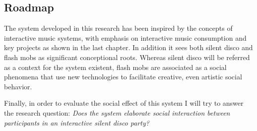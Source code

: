 
\subsection{Roadmap}


The system developed in this research has been inspired by the concepts of interactive music systems, with emphasis on interactive music consumption and key projects as shown in the last chapter. In addition it sees both silent disco and flash mobs as significant conceptional roots. Whereas silent disco will be referred as a context for the system existent, flash mobs are associated as a social phenomena that use new technologies to facilitate creative, even artistic social behavior.


Finally, in order to evaluate the social effect of this system I will try to answer the research question: \emph{Does the system elaborate social interaction between participants in an interactive silent disco party?}